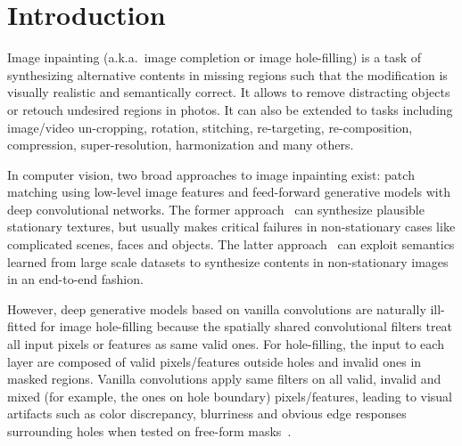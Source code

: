 \documentclass[10pt,twocolumn,letterpaper]{article}
\begin{document}
\section{Introduction}
Image inpainting (a.k.a.\ image completion or image hole-filling) is a task of synthesizing alternative contents in missing regions such that the modification is visually realistic and semantically correct. It allows to remove distracting objects or retouch undesired regions in photos. It can also be extended to tasks including image/video un-cropping, rotation, stitching, re-targeting, re-composition, compression, super-resolution, harmonization and many others.

In computer vision, two broad approaches to image inpainting exist: patch matching using low-level image features and feed-forward generative models with deep convolutional networks. The former approach~\cite{barnes2009patchmatch, efros2001image, efros1999texture} can synthesize plausible stationary textures, but usually makes critical failures in non-stationary cases like complicated scenes, faces and objects. The latter approach~\cite{iizuka2017globally, yu2018generative, xiong2019foreground, yang2018image, song2018spg, song2018contextual, yu2018wide, nazeri2019edgeconnect, zheng2019pluralistic, sagong2019pepsi, shin2019pepsipp, kim2019deep} can exploit semantics learned from large scale datasets to synthesize contents in non-stationary images in an end-to-end fashion.

However, deep generative models based on vanilla convolutions are naturally ill-fitted for image hole-filling because the spatially shared convolutional filters treat all input pixels or features as same valid ones. For hole-filling, the input to each layer are composed of valid pixels/features outside holes and invalid ones in masked regions. Vanilla convolutions apply same filters on all valid, invalid and mixed (for example, the ones on hole boundary) pixels/features, leading to visual artifacts such as color discrepancy, blurriness and obvious edge responses surrounding holes when tested on free-form masks~\cite{iizuka2017globally, yu2018generative}.
\end{document}
